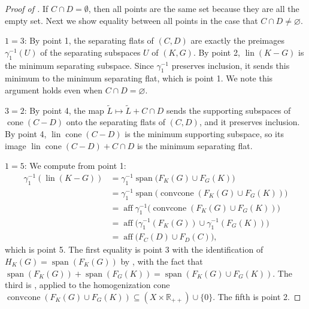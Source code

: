 \documentclass[10pt,a4paper]{amsart}
\DeclareMathOperator{\Span}{\mathrm{span}}
\DeclareMathOperator{\aff}{aff}
\DeclareMathOperator{\cone}{cone}
\DeclareMathOperator{\convcone}{convcone}
\DeclareMathOperator{\lin}{lin}
\begin{document}
\begin{proof}[\hypertarget{loc:affine_cross:lineality.proof}{}Proof of ]

If $C \cap D =  \emptyset$, then all points are the same set because they are
all the empty set. Next we show equality between all points in the case that $C \cap D \neq \varnothing$.

$1 = 3$:
By  point 1,
the separating flats of $(C,D)$ are exactly the preimages $\gamma_1^{-1}(U)$ of the separating subspaces $U$ of $(K,G)$. By  point 2, $\lin(K-G)$ is the minimum separating subspace. Since $\gamma_1^{-1}$ preserves inclusion, it sends this minimum to the minimum separating flat, which is point 1. We note this argument holds even when $C \cap D = \varnothing$.

$3 = 2$:
By  point 4, the map $\tilde{L} \mapsto \tilde{L} + C \cap D$ sends the supporting subspaces of $\cone(C-D)$ onto the separating flats of $(C,D)$, and it preserves inclusion. By  point 4, $\lin\cone(C-D)$ is the minimum supporting subspace, so its image $\lin\cone(C-D) + C \cap D$ is the minimum separating flat.

$1 = 5$:
We compute from point 1:
\begin{align*}
\gamma_1^{-1}(\lin(K-G))
&= \gamma_1^{-1}\Span\bigl(F_K(G) \cup F_G(K)\bigr)\\
&= \gamma_1^{-1}\Span\bigl(\convcone(F_K(G) \cup F_G(K))\bigr)\\
&= \aff \gamma_1^{-1}\bigl(\convcone(F_K(G) \cup F_G(K))\bigr)\\
&= \aff\bigl(\gamma_1^{-1}(F_K(G)) \cup \gamma_1^{-1}(F_G(K))\bigr)\\
&= \aff\bigl(F_C(D) \cup F_D(C)\bigr),
\end{align*}
which is point 5. The first equality is  point 3 with the identification of $H_K(G) = \Span(F_K(G))$ by , with the fact that 
$\Span(F_K(G)) + \Span(F_G(K)) =  \Span(F_K(G) \cup F_G(K))$. The third is , applied to the homogenization cone $\convcone(F_K(G) \cup F_G(K)) \subseteq (X \times \mathbb{R}_{++}) \cup \{0\}$.
The fifth is  point 2.


\end{proof}
\end{document}
